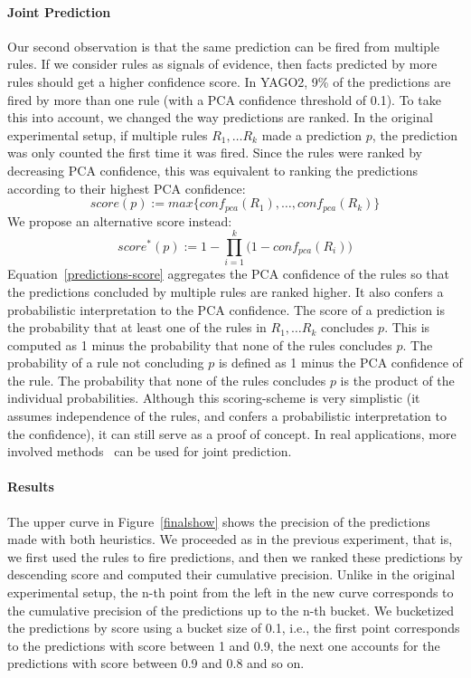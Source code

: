 \paragraph{Joint Prediction} Our second observation is that the same prediction can be fired from multiple rules. If we consider rules as signals of evidence,
then facts predicted by more rules should get a higher confidence score.
In YAGO2, 9\% of the predictions are fired by more than one rule (with a PCA confidence threshold of 0.1).
To take this into account, we changed the way predictions are ranked. In the original experimental setup, if
multiple rules $R_1, \dots R_k$ made a prediction $p$, the prediction was only counted the first time it was fired.
Since the rules were ranked by decreasing PCA confidence,
this was equivalent to ranking the predictions according to their highest PCA confidence:
\[
 score(p) := max\{conf_{pca}(R_1), \dots, conf_{pca}(R_k) \}
\]
We propose an alternative score instead:
\begin{equation}\label{predictions-score}
 score^*(p) := 1 - \prod_{i = 1}^{k}{(1 -conf_{pca}(R_i)})
\end{equation}
Equation~\ref{predictions-score} aggregates the PCA confidence of the rules so that the predictions concluded by multiple rules
are ranked higher. It also confers a probabilistic interpretation to the PCA confidence. The score of a prediction
is the probability that at least one of the rules in $R_1, \dots R_k$ concludes $p$. This is computed as 1 minus the probability
that none of the rules concludes $p$. The probability of a rule not concluding $p$ is defined as 1 minus the PCA confidence of the rule.
The probability that none of the rules concludes $p$ is the product of the individual probabilities.
Although this scoring-scheme is very simplistic (it assumes independence of the rules, and confers a probabilistic interpretation to the confidence), it can still serve as
a proof of concept. In real applications, more involved methods~\cite{markovlogic,urdf} can be used for joint prediction.






\paragraph{Results} The upper curve in Figure~\ref{finalshow} shows the precision of the predictions made with both heuristics.
We proceeded as in the previous experiment, that is,
we first used the rules to fire predictions, and then we ranked these predictions by descending score and computed their cumulative precision.
Unlike in the original experimental setup, the n-th point from the left in the new curve corresponds to the cumulative precision
of the predictions up to the n-th bucket. We bucketized the predictions by score using a bucket size of 0.1, i.e., the first point
corresponds to the predictions with score between 1 and 0.9, the next one accounts for the predictions with score between 0.9 and 0.8 and so on.

